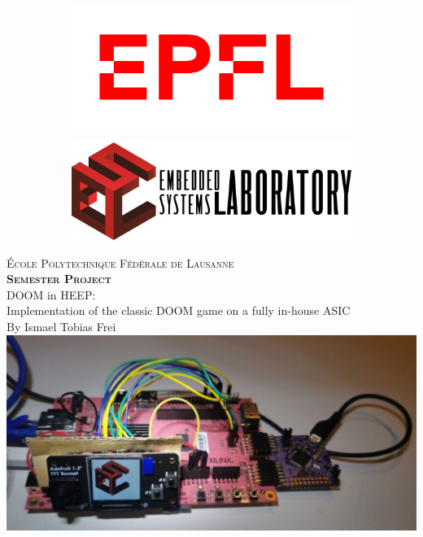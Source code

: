 \begin{titlepage}
 
    \centering
    
    \begin{figure}
    \centering
    \begin{subfigure}{.5\textwidth}
      \centering
      \includegraphics[width=.7\linewidth, left]{images/images_front_page/EPFL_logo.png}
    \end{subfigure}%
    \begin{subfigure}{.5\textwidth}
      \centering
      \includegraphics[width=.7\linewidth, right]{images/images_front_page/ESL_logo.png}
    \end{subfigure}
    
    \end{figure}

    \vspace{2cm}
    
    \textsc{\Large École Polytechnique Fédérale de Lausanne}
    \\ [1cm]
    \textbf{\textsc{\LARGE Semester Project}}
    \\ [1cm]
    {\Large DOOM in HEEP: }
    \\
    {\Large Implementation of the classic DOOM game on a fully in-house ASIC}
    \\ [0.75cm]
    {\large By Ismael Tobias Frei}
    \\ [1cm]
    \includegraphics[width=0.8\linewidth]{images/FPGA_ESL_LOGO.jpg}
    \\[1cm]
    

\end{titlepage}

